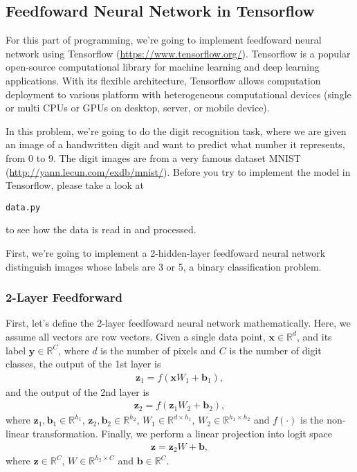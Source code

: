 \documentclass[letterpaper]{article}
\providecommand{\xvec}{\textbf{x}}
\providecommand{\yvec}{\textbf{y}}
\providecommand{\zvec}{\textbf{z}}
\providecommand{\bvec}{\textbf{b}}
\providecommand{\RR}{\mathbb{R}}
\begin{document}
\subsection{Feedfoward Neural Network in Tensorflow}

For this part of programming, we're going to implement feedfoward neural network
using Tensorflow (\url{https://www.tensorflow.org/}). Tensorflow is a popular
open-source computational library for machine learning and deep learning
applications. With its flexible architecture, Tensorflow allows computation
deployment to various platform with heterogeneous computational devices (single
or multi CPUs or GPUs on desktop, server, or mobile device).

In this problem, we're going to do the digit recognition task, where we are
given an image of a handwritten digit and want to predict what number it
represents, from $0$ to $9$. The digit images are from a very famous dataset
MNIST (\url{http://yann.lecun.com/exdb/mnist/}). Before you try to implement the
model in Tensorflow, please take a look at 
\begin{verbatim}
data.py
\end{verbatim} to see how the data is read in and processed.

First, we're going to implement a 2-hidden-layer feedfoward neural network
distinguish images whose labels are 3 or 5, a binary classification problem.

\subsubsection{2-Layer Feedforward}
First, let's define the 2-layer feedfoward neural network mathematically.
Here, we assume all vectors are row vectors.
Given a single data point, $\xvec\in\RR^d$, and its label $\yvec\in\RR^C$,
where $d$ is the number of pixels and $C$ is the number of digit classes,
the output of the 1st layer is
\begin{eqnarray}
	\zvec_1 = f(\xvec W_1 + \bvec_1),
	\label{eqn:hidden1}
\end{eqnarray}
and the output of the 2nd layer is
\begin{eqnarray}
	\zvec_2 = f(\zvec_1 W_2 + \bvec_2),
	\label{eqn:hidden2}
\end{eqnarray}
where $\zvec_1,\bvec_1\in\RR^{h_1}$, $\zvec_2,\bvec_2\in\RR^{h_2}$, $W_1\in\RR^{d\times h_1}$,
$W_2\in\RR^{h_1\times h_2}$ and $f(\cdot)$ is the non-linear transformation.
Finally, we perform a linear projection into logit space
\begin{eqnarray}
	\zvec = \zvec_2 W + \bvec,
	\label{eqn:logits}
\end{eqnarray}
where $\zvec\in\RR^C$, $W\in\RR^{h_2\times C}$ and $\bvec\in\RR^C$.
\end{document}

